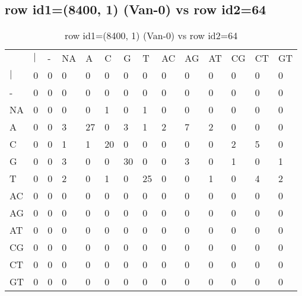 \subsection{row id1=(8400, 1) (Van-0) vs row id2=64}
\begin{center}
\begin{longtable}{|l|l|l|l|l|l|l|l|l|l|l|l|l|l|}
\caption{row id1=(8400, 1) (Van-0) vs row id2=64} \label{table_dm656}\\
\hline
\\
\hline
&$|$&-&NA&A&C&G&T&AC&AG&AT&CG&CT&GT\\
$|$&0&0&0&0&0&0&0&0&0&0&0&0&0\\
-&0&0&0&0&0&0&0&0&0&0&0&0&0\\
NA&0&0&0&0&1&0&1&0&0&0&0&0&0\\
A&0&0&3&27&0&3&1&2&7&2&0&0&0\\
C&0&0&1&1&20&0&0&0&0&0&2&5&0\\
G&0&0&3&0&0&30&0&0&3&0&1&0&1\\
T&0&0&2&0&1&0&25&0&0&1&0&4&2\\
AC&0&0&0&0&0&0&0&0&0&0&0&0&0\\
AG&0&0&0&0&0&0&0&0&0&0&0&0&0\\
AT&0&0&0&0&0&0&0&0&0&0&0&0&0\\
CG&0&0&0&0&0&0&0&0&0&0&0&0&0\\
CT&0&0&0&0&0&0&0&0&0&0&0&0&0\\
GT&0&0&0&0&0&0&0&0&0&0&0&0&0\\
\hline
\end{longtable}
\end{center}

